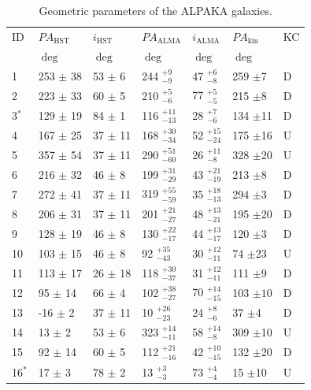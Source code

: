 \begin{table}[t!]
\begin{center}
\caption{Geometric parameters of the ALPAKA galaxies.}
\label{tab:PA}
\begin{tabular}{lllllll}%
\hline\hline \noalign{\smallskip}
ID   & $PA_{\mathrm{HST}}$ & $i_{\mathrm{HST}}$ & $PA_{\mathrm{ALMA}}$ & $i_{\mathrm{ALMA}}$ & $PA_{\mathrm{kin}}$ & KC\\
& $\deg$ & $\deg$ & $\deg$ & $\deg$ &  $\deg$ \\
\noalign{\smallskip}
\hline
\noalign{\medskip}
1 & 253 $\pm$ 38 & 53 $\pm$ 6 & 244 $^{+9}_{-9}$ & 47 $^{+6}_{-8}$ & 259 $\pm$7 & D\\ 
2 &223 $\pm$ 33 & 60 $\pm$ 5 & 210 $^{+5}_{-6}$ & 77 $^{+5}_{-5}$ & 215 $\pm$8 & D\\
3$^{*}$ & 129 $\pm$ 19 & 84 $\pm$ 1 & 116 $^{+11}_{-13}$ & 28 $^{+7}_{-6}$ & 134 $\pm$11 & D\\
4 & 167 $\pm$ 25 & 37 $\pm$ 11 & 168 $^{+30}_{-34}$ & 52 $^{+15}_{-24}$ & 175 $\pm$16 & U\\
5 & 357 $\pm$ 54 & 37 $\pm$ 11 &  290 $^{+51}_{-60}$ & 26 $^{+11}_{-8}$ & 328 $\pm$20 & U\\
6 & 216 $\pm$ 32 & 46 $\pm$ 8 & 199 $^{+31}_{-29}$  & 43 $^{+21}_{-19}$ & 213 $\pm$8 & D\\
7 & 272 $\pm$ 41 & 37 $\pm$ 11 &  319 $^{+55}_{-59}$ & 35 $^{+18}_{-13}$ & 294 $\pm$3 & D\\
8 & 206 $\pm$ 31 & 37 $\pm$ 11 & 201 $^{+21}_{-27}$ & 48 $^{+13}_{-21}$ & 195 $\pm$20 & D\\
9 & 128 $\pm$ 19 & 46 $\pm$ 8 & 130 $^{+22}_{-17}$ & 44 $^{+13}_{-17}$ & 120 $\pm$3 & D\\
10 & 103 $\pm$ 15 & 46 $\pm$ 8 & 92 $^{+35}_{-43}$ & 30 $^{+12}_{-11}$ & 74 $\pm$23 & U\\
11 & 113 $\pm$ 17 & 26 $\pm$ 18 & 118 $^{+30}_{-37}$ & 31 $^{+12}_{-11}$ & 111 $\pm$9 & D\\
12 & 95 $\pm$ 14 & 66 $\pm$ 4 & 102 $^{+38}_{-27}$ & 70 $^{+14}_{-15}$ & 103 $\pm 10$ & D\\
13 & -16 $\pm$ 2 & 37 $\pm$ 11 & 10 $^{+26}_{-23}$ & 24 $^{+8}_{-6}$ & 37 $\pm$4 & D\\
14 & 13 $\pm$ 2 & 53 $\pm$ 6 &  323 $^{+14}_{-11}$  & 58 $^{+14}_{-8}$ & 309 $\pm$10 & U\\
15 & 92 $\pm$ 14 & 60 $\pm$ 5 & 112 $^{+21}_{-16}$ & 42 $^{+10}_{-15}$ & 132 $\pm$20  & D\\
16$^{*}$ & 17 $\pm$ 3 & 78 $\pm$ 2 & 13 $^{+3}_{-3}$  & 73 $^{+4}_{-4}$ & 15 $\pm$10  & U\\

\end{tabular}
\end{center}
\end{table}
